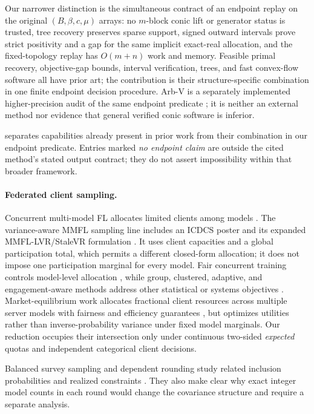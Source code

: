 \documentclass[smallextended,envcountsect]{svjour3}
\begin{document}
Our narrower distinction is the simultaneous contract of an endpoint replay on
the original $(B,\beta,c,\mu)$ arrays: no $m$-block conic lift or generator
status is trusted, tree recovery preserves sparse support, signed outward
intervals prove strict positivity and a gap for the same implicit exact-real
allocation, and the fixed-topology replay has $O(m+n)$ work and memory.  Feasible
primal recovery, objective-gap bounds, interval verification, trees, and fast
convex-flow software all have prior art; the contribution is their
structure-specific combination in one finite endpoint decision procedure.
Arb-V is a separately implemented higher-precision audit of the same endpoint predicate
\citep{johansson2017arb}; it is neither an external method nor evidence that
general verified conic software is inferior.

 separates capabilities already present in prior work
from their combination in our endpoint predicate.  Entries marked
\emph{no endpoint claim} are outside the cited method's stated output contract;
they do not assert impossibility within that broader framework.


\paragraph{Federated client sampling.}
Concurrent multi-model FL allocates limited clients among models
\citep{bhuyan2022mmfl,bhuyan2022provable,askin2024fedast}.  The variance-aware
MMFL sampling line includes an ICDCS poster and its expanded
MMFL-LVR/StaleVR formulation
\citep{zhang2024poster,zhang2025optimal}.  It uses client capacities and a
global participation total, which permits a different closed-form allocation;
it does not impose one participation marginal for every model.
Fair concurrent training controls model-level allocation
\citep{siew2025fair}, while group, clustered, adaptive, and engagement-aware
methods address other statistical or systems objectives
\citep{fraboni2021clustered,gong2025group,zhao2025adaptive,lin2025flammable}.
Market-equilibrium work allocates fractional client resources across multiple
server models with fairness and efficiency guarantees
\citep{diamanti2026market}, but optimizes utilities rather than
inverse-probability variance under fixed model marginals.
Our reduction occupies their intersection only under continuous two-sided
\emph{expected} quotas and independent categorical client decisions.

Balanced survey sampling and dependent rounding study related inclusion
probabilities and realized constraints
\citep{horvitz1952,tille2005optimal,chauvet2011optimal,gandhi2006rounding,rivest2023fixed}.
They also make clear why exact integer model counts in each round would change
the covariance structure and require a separate analysis.
\end{document}
